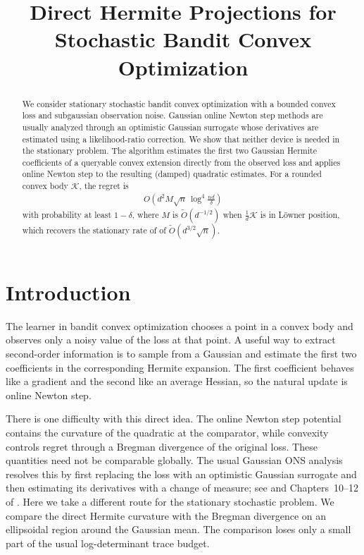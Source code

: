 \documentclass[11pt]{article}
\title{Direct Hermite Projections for Stochastic Bandit Convex Optimization}
\author{\qquad}
\date{}
\newcommand{\K}{\mathcal K}
\newcommand{\1}{\mathbf 1}
\begin{document}
\maketitle

\begin{abstract}
    We consider stationary stochastic bandit convex optimization with a bounded
    convex loss and subgaussian observation noise.  Gaussian online Newton step
    methods are usually analyzed through an optimistic Gaussian surrogate whose
    derivatives are estimated using a likelihood-ratio correction.  We show that
    neither device is needed in the stationary problem.  The algorithm estimates
    the first two Gaussian Hermite coefficients of a queryable convex extension
    directly from the observed loss and applies online Newton step to the resulting
    (damped) quadratic estimates.
    For a rounded convex body $\K$, the regret is
    \begin{align}
        O\!\left(d^2 M\sqrt n\,
        \log^4\!\frac{nd}{\delta}\right)
    \end{align}
    with probability at least $1-\delta$, where $M$ is $\tilde{O}(d^{-1/2})$
    when $\frac1d \K$ is in L\"owner position,
    which recovers the stationary rate of \citet{lattimore2023second}
    of $\widetilde O(d^{3/2}\sqrt n)$.
\end{abstract}

\section{Introduction}

The learner in bandit convex optimization chooses a point in a convex body
and observes only a noisy value of the loss at that point.  A useful way to
extract second-order information is to sample from a Gaussian and estimate the
first two coefficients in the corresponding Hermite expansion.  The first
coefficient behaves like a gradient and the second like an average Hessian, so
the natural update is online Newton step.

There is one difficulty with this direct idea.  The online Newton step
potential contains the curvature of the quadratic at the comparator, while
convexity controls regret through a Bregman divergence of the original loss.
These quantities need not be comparable globally.  The usual Gaussian ONS
analysis resolves this by first replacing the loss with an optimistic
Gaussian surrogate and then estimating its derivatives with a change of
measure; see \citet{lattimore2023second} and Chapters~10--12 of
\citet{lattimore2026bandit}.  Here we take a
different route for the stationary stochastic problem.  We compare the direct
Hermite curvature with the Bregman divergence on an ellipsoidal region around
the Gaussian mean.  The comparison loses only a small part of the usual
log-determinant trace budget.
\end{document}
